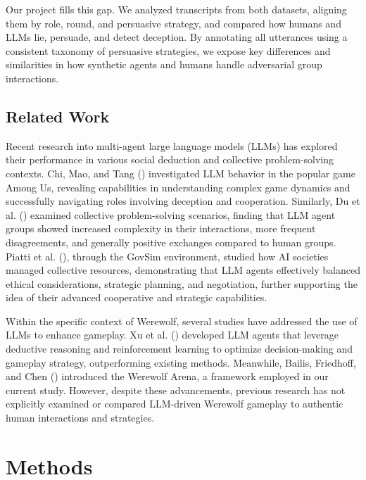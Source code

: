 \documentclass[
  letterpaper,
  DIV=11,
  numbers=noendperiod,
  oneside]{scrreprt}
\begin{document}
Our project fills this gap. We analyzed transcripts from both datasets,
aligning them by role, round, and persuasive strategy, and compared how
humans and LLMs lie, persuade, and detect deception. By annotating all
utterances using a consistent taxonomy of persuasive strategies, we
expose key differences and similarities in how synthetic agents and
humans handle adversarial group interactions.

\section{Related Work}\label{related-work}

Recent research into multi-agent large language models (LLMs) has
explored their performance in various social deduction and collective
problem-solving contexts. Chi, Mao, and Tang
() investigated
LLM behavior in the popular game Among Us, revealing capabilities in
understanding complex game dynamics and successfully navigating roles
involving deception and cooperation. Similarly, Du et al.
() examined collective problem-solving scenarios, finding that LLM
agent groups showed increased complexity in their interactions, more
frequent disagreements, and generally positive exchanges compared to
human groups. Piatti et al.
(), through the
GovSim environment, studied how AI societies managed collective
resources, demonstrating that LLM agents effectively balanced ethical
considerations, strategic planning, and negotiation, further supporting
the idea of their advanced cooperative and strategic capabilities.

Within the specific context of Werewolf, several studies have addressed
the use of LLMs to enhance gameplay. Xu et al.
() developed LLM
agents that leverage deductive reasoning and reinforcement learning to
optimize decision-making and gameplay strategy, outperforming existing
methods. Meanwhile, Bailis, Friedhoff, and Chen
() introduced the
Werewolf Arena, a framework employed in our current study. However,
despite these advancements, previous research has not explicitly
examined or compared LLM-driven Werewolf gameplay to authentic human
interactions and strategies.

\chapter{Methods}\label{methods}
\end{document}
